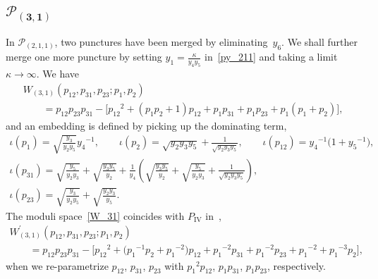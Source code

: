\documentclass[pdftex]{sigma}
\numberwithin{equation}{section}
\begin{document}
\subsection[$\mathcal{P}_{(3,1)}$]{$\boldsymbol{\mathcal{P}_{(3,1)}}$}
In $\mathcal{P}_{(2,1,1)}$, two punctures have been merged by eliminating~$y_6$. We shall further merge one more puncture by setting $ y_1 = \frac{\kappa}{y_4 y_5}$ in~\eqref{py_211} and taking a limit $\kappa \to \infty$. We have
\begin{gather}
 W_{(3,1)}(p_{12}, p_{31}, p_{23}; p_1, p_2)\nonumber \\
\qquad{} = p_{12} p_{23} p_{31} - \big[ {p_{12}}^2 + ( p_1 p_2+1 ) p_{12} +p_1 p_{31} + p_1 p_{23} + p_1 ( p_1 + p_2 ) \big], \label{W_31}
\end{gather}
and an embedding is defined by picking up the dominating term,
\begin{gather}
 \iota(p_1) = \sqrt{\frac{y_3}{y_2 y_5}} {y_4}^{-1},\qquad \iota(p_2) = \sqrt{y_2 y_3 y_5} +\frac{1}{\sqrt{y_2 y_3 y_5}} ,\qquad
 \iota(p_{12}) = {y_4}^{-1} \big( 1 + {y_5}^{-1} \big) ,\nonumber \\
 \iota(p_{31}) = \sqrt{\frac{y_5}{y_2 y_3}} + \sqrt{\frac{y_3 y_5}{y_2}} +\frac{1}{y_4} \left( \sqrt{\frac{y_3 y_5}{y_2}} + \sqrt{\frac{y_5}{y_2 y_3}} + \frac{1}{\sqrt{y_2 y_3 y_5}} \right) , \nonumber\\
 \iota(p_{23}) = \sqrt{\frac{y_3}{y_2 y_5}} + \sqrt{\frac{y_2 y_3}{y_5}} . \label{py_31}
\end{gather}
The moduli space~\eqref{W_31} coincides with $P_{\mathrm{IV}}$
in~\cite{vdPutSaito09a},
\begin{gather*}
 W^\prime_{(3,1)}(p_{12}, p_{31}, p_{23}; p_1, p_2) \\
\qquad{} = p_{12} p_{23} p_{31} - \big[ {p_{12}}^2 + \big( {p_1}^{-1} p_2+ {p_1}^{-2} \big) p_{12} +{p_1}^{-2} p_{31} + {p_1}^{-2} p_{23} + {p_1}^{-2}+{p_1}^{-3} p_2 \big] ,
\end{gather*}
when we re-parametrize $p_{12}$, $p_{31}$, $p_{23}$ with ${p_1}^2 p_{12}$, $p_1 p_{31}$, $p_1 p_{23}$, respectively.
\end{document}
